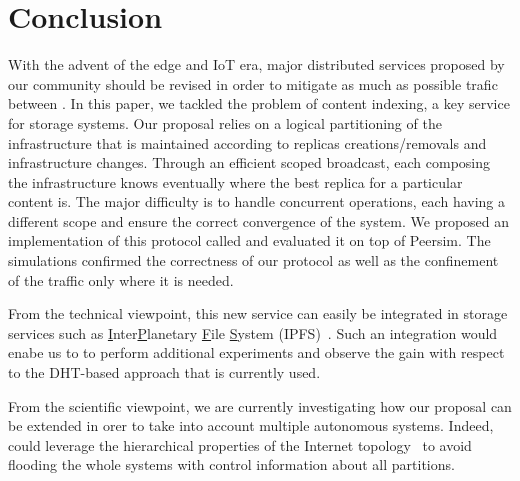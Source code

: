 
\section{Conclusion}
\label{sec:conclusion}

With the advent of the edge and IoT era, major distributed services
proposed by our community should be revised in order to mitigate as
much as possible trafic between \processes.  In this paper, we tackled
the problem of content indexing, a key service for storage systems.
%
Our proposal relies on a logical partitioning of the infrastructure
that is maintained according to replicas creations/removals and
infrastructure changes. Through an efficient scoped broadcast, each
\process composing the infrastructure knows eventually where the best
replica for a particular content is. The major difficulty is to handle
concurrent operations, each having a different scope and ensure the
correct convergence of the system.
%
We proposed an implementation of this protocol called \NAME and
evaluated it on top of Peersim. The simulations confirmed the
correctness of our protocol as well as the confinement of the traffic
only where it is needed.

% 
From the technical viewpoint, this new service can easily be
integrated in storage services such as
\underline{I}nter\underline{P}lanetary \underline{F}ile
\underline{S}ystem (IPFS)~\cite{henningsen2020mapping}.  Such an integration would enabe us to
to perform additional experiments and observe the gain with 
respect to the DHT-based approach that is currently used.

%


From the scientific viewpoint, we are currently investigating how our
proposal can be extended in orer to take into account multiple
autonomous systems. Indeed, \processes could leverage the hierarchical
properties of the Internet topology~\cite{nur2018geography} to avoid
flooding the whole systems with control information about all
partitions.



